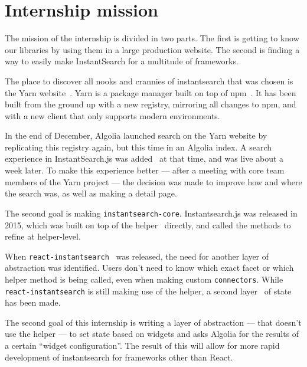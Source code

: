 
\chapter{Internship mission} %
\label{chp:mission}


The mission of the internship is divided in two parts. The first is getting to know our libraries by using them in a large production website. The second is finding a way to easily make InstantSearch for a multitude of frameworks.

The place to discover all nooks and crannies of instantsearch that was chosen is the Yarn website~\cite{yarn-site}. Yarn is a package manager built on top of npm~\cite{npm-github}. It has been built from the ground up with a new registry, mirroring all changes to npm, and with a new client that only supports modern environments.

In the end of December, Algolia launched search on the Yarn website by replicating this registry again, but this time in an Algolia index. A search experience in InstantSearch.js was added~\cite{yarn-pr-add-algolia} at that time, and was live about a week later. To make this experience better --- after a meeting with core team members of the Yarn project --- the decision was made to improve how and where the search was, as well as making a detail page.

The second goal is making {\tt instantsearch-core}. Instantsearch.js was released in 2015, which was built on top of the helper~\cite{algolia-js-helper} directly, and called the methods to refine at helper-level.

When {\tt react-instantsearch}~\cite{react-instantsearch} was released, the need for another layer of abstraction was identified. Users don't need to know which exact facet or which helper method is being called, even when making custom {\tt connectors}\cite{react-instantsearch-connectors}. While {\tt react-instantsearch} is still making use of the helper, a second layer~\cite{react-instantsearch-search-state} of state has been made.

The second goal of this internship is writing a layer of abstraction --- that doesn't use the helper --- to set state based on widgets and asks Algolia for the results of a certain ``widget configuration''. The result of this will allow for more rapid development of instantsearch for frameworks other than React.
